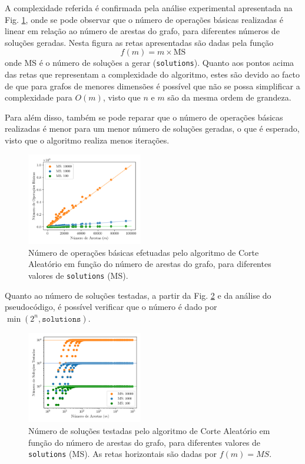 \documentclass[mirror, portugues]{revdetua}
\begin{document}
A complexidade referida é confirmada pela análise experimental apresentada na Fig. \ref{fig:random_ops}, onde se pode observar que o número de operações básicas realizadas é linear em relação ao número de arestas do grafo, para diferentes números de soluções geradas. Nesta figura as retas apresentadas são dadas pela função $$f(m) = m \times \text{MS}$$ onde MS é o número de soluções a gerar (\texttt{solutions}). Quanto aos pontos acima das retas que representam a complexidade do algoritmo, estes são devido ao facto de que para grafos de menores dimensões é possível que não se possa simplificar a complexidade para $O(m)$, visto que $n$ e $m$ são da mesma ordem de grandeza.

Para além disso, também se pode reparar que o número de operações básicas realizadas é menor para um menor número de soluções geradas, o que é esperado, visto que o algoritmo realiza menos iterações.

\begin{figure}[H]
    \centering
    \includegraphics[width=0.45\textwidth]{../assets/ops_Random Sol.png}
    \caption{Número de operações básicas efetuadas pelo algoritmo de Corte Aleatório em função do número de arestas do grafo, para diferentes valores de \texttt{solutions} (MS).}
    \label{fig:random_ops}
\end{figure}

Quanto ao número de soluções testadas, a partir da Fig. \ref{fig:sols_randomrandom} e da análise do pseudocódigo, é possível verificar que o número é dado por $\min(2^n, \texttt{solutions})$.

\begin{figure}[H]
    \centering
    \includegraphics[width=0.45\textwidth]{../assets/sols_Random Sol.png}
    \caption{Número de soluções testadas pelo algoritmo de Corte Aleatório em função do número de arestas do grafo, para diferentes valores de \texttt{solutions} (MS). As retas horizontais são dadas por $f(m) = MS$.}
    \label{fig:sols_randomrandom}
\end{figure}
\end{document}

